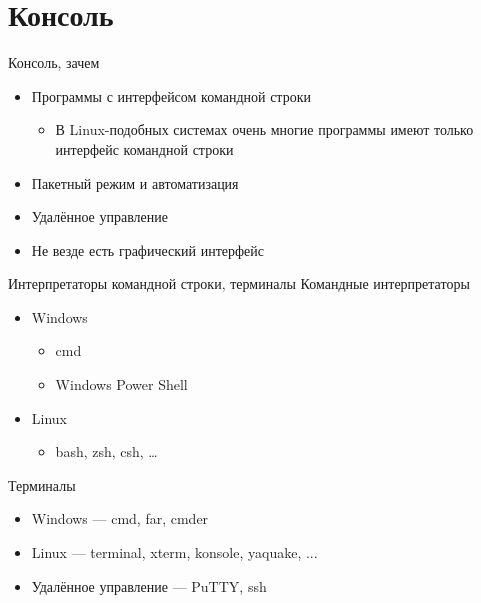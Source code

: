 \documentclass{../../slides-style}
\begin{document}
    
    \begin{frame}[plain]
        \titlepage
    \end{frame}

    \section{Консоль}

    \begin{frame}{Консоль, зачем}
        \begin{itemize}
            \item Программы с интерфейсом командной строки
            \begin{itemize}
                \item В Linux-подобных системах очень многие программы имеют только интерфейс командной строки
            \end{itemize}
            \item Пакетный режим и автоматизация
            \item Удалённое управление
            \item Не везде есть графический интерфейс
        \end{itemize}
    \end{frame}

    \begin{frame}{Интерпретаторы командной строки, терминалы}
        Командные интерпретаторы
        \begin{itemize}
            \item Windows
            \begin{itemize}
                \item cmd
                \item Windows Power Shell
            \end{itemize}
            \item Linux
            \begin{itemize}
                \item bash, zsh, csh, …
            \end{itemize}
        \end{itemize}
        Терминалы
        \begin{itemize}
            \item Windows --- cmd, far, cmder
            \item Linux --- terminal, xterm, konsole, yaquake, ...
            \item Удалённое управление --- PuTTY, ssh
        \end{itemize}
    \end{frame}
\end{document}
